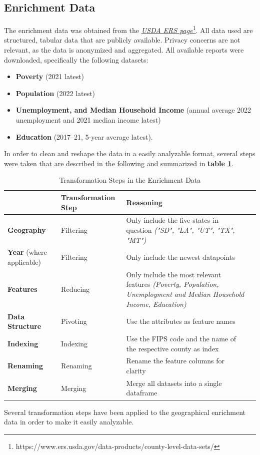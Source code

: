 \subsection{Enrichment Data}\label{subsec:Enrichment_Data}

The enrichment data was obtained from the \textit{\href{https://www.ers.usda.gov/data-products/county-level-data-sets/}{USDA ERS page}}\footnote{https://www.ers.usda.gov/data-products/county-level-data-sets/}. All data used are structured, tabular data that are publicly available. Privacy concerns are not relevant, as the data is anonymized and aggregated. All available reports were downloaded, specifically the following datasets:

\begin{itemize}
    \item \textbf{Poverty} (2021 latest)
    \item \textbf{Population} (2022 latest)
    \item \textbf{Unemployment, and Median Household Income} (annual average 2022 unemployment and 2021 median income latest)
    \item \textbf{Education} (2017–21, 5-year average latest).
\end{itemize}

In order to clean and reshape the data in a easily analyzable format, several steps were taken that are described in the following and summarized in \textbf{table \ref{tab:enrichment_transformation_summary}}. %

\begin{table}[h]
    \centering
    \begin{tabularx}{\textwidth}{l *{3}{>{\centering\arraybackslash}X}}
    \hline
     & \textbf{Transformation Step} & \textbf{Reasoning} \\
    \hline
    \textbf{Geography} & Filtering & Only include the five states in question \textit{("SD", "LA", "UT", "TX", "MT")} \\
    \textbf{Year} (where applicable) & Filtering & Only include the newest datapoints \\
    \textbf{Features} & Reducing & Only include the most relevant features \textit{(Poverty, Population, Unemployment and Median Household Income, Education)} \\
    \textbf{Data Structure} & Pivoting & Use the attributes as feature names \\
    \textbf{Indexing} & Indexing & Use the FIPS code and the name of the respective county as index \\
    \textbf{Renaming} & Renaming & Rename the feature columns for clarity \\
    \textbf{Merging} & Merging & Merge all datasets into a single dataframe \\
    \hline
    \end{tabularx}
    \caption{Transformation Steps in the Enrichment Data}
    \small
    Several transformation steps have been applied to the geographical enrichment data in order to make it easily analyzable.
    \label{tab:enrichment_transformation_summary}
\end{table}

